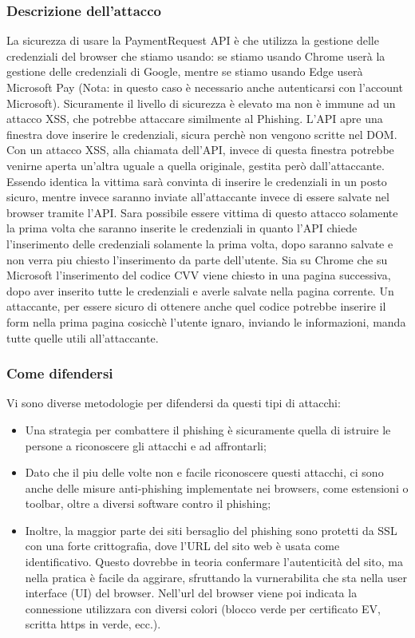 \documentclass[italian]{article}
\begin{document}
	\subsubsection{Descrizione dell'attacco}
	La sicurezza di usare la PaymentRequest API è che utilizza la gestione delle credenziali del browser che stiamo usando: se stiamo usando Chrome userà la gestione delle credenziali di Google, mentre se stiamo usando Edge userà Microsoft Pay (Nota: in questo caso è necessario anche autenticarsi con l'account Microsoft).
	Sicuramente il livello di sicurezza è elevato ma non è immune ad un attacco XSS, che potrebbe attaccare similmente al Phishing. 
	L'API apre una finestra dove inserire le credenziali, sicura perchè non vengono scritte nel DOM. Con un attacco XSS, alla chiamata dell'API, invece di questa finestra potrebbe venirne aperta un'altra uguale a quella originale, gestita però dall'attaccante. Essendo identica la vittima sarà convinta di inserire le credenziali in un posto sicuro, mentre invece saranno inviate all'attaccante invece di essere salvate nel browser tramite l'API.
	Sara possibile essere vittima di questo attacco solamente la prima volta che saranno inserite le credenziali in quanto l'API chiede l'inserimento delle credenziali solamente la prima volta, dopo saranno salvate e non verra piu chiesto l'inserimento da parte dell'utente.
	Sia su Chrome che su Microsoft l'inserimento del codice CVV viene chiesto in una pagina successiva, dopo aver inserito tutte le credenziali e averle salvate nella pagina corrente. Un attaccante, per essere sicuro di ottenere anche quel codice potrebbe inserire il form nella prima pagina cosicchè l'utente ignaro, inviando le informazioni, manda tutte quelle utili all'attaccante.
	\subsubsection{Come difendersi}
	Vi sono diverse metodologie per difendersi da questi tipi di attacchi:
	\begin{itemize}
	\item Una strategia per combattere il phishing è sicuramente quella di istruire le persone a riconoscere gli attacchi e ad affrontarli;
	\item Dato che il piu delle volte non e facile riconoscere questi attacchi, ci sono anche delle misure anti-phishing implementate nei browsers, come estensioni o toolbar, oltre a diversi software contro il phishing;
	\item Inoltre, la maggior parte dei siti bersaglio del phishing sono protetti da SSL con una forte crittografia, dove l'URL del sito web è usata come identificativo. Questo dovrebbe in teoria confermare l'autenticità del sito, ma nella pratica è facile da aggirare, sfruttando la vurnerabilita che sta nella user interface (UI) del browser. Nell'url del browser viene poi indicata la connessione utilizzara con diversi colori (blocco verde per certificato EV, scritta https in verde, ecc.).
	\end{itemize}
\end{document}
